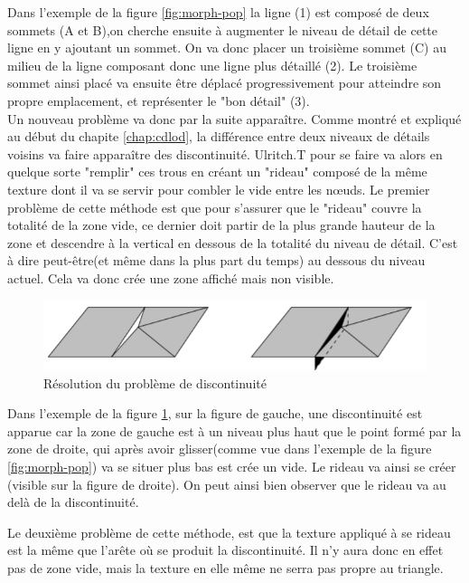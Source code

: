 \newpage
  Dans l'exemple de la figure \ref{fig:morph-pop} la ligne (1) est composé de deux sommets (A et B),on cherche ensuite à augmenter le niveau de détail de cette ligne en y ajoutant un sommet. On va donc placer un troisième sommet (C) au milieu de la ligne composant donc une ligne plus détaillé (2). Le troisième sommet ainsi placé va ensuite être déplacé progressivement pour atteindre son propre emplacement, et représenter le "bon détail" (3).\\

 Un nouveau problème va donc par la suite apparaître. Comme montré et expliqué au début du chapite \ref{chap:cdlod}, la différence entre deux niveaux de détails voisins va faire apparaître des discontinuité. Ulritch.T pour se faire va alors en quelque sorte "remplir" ces trous en créant un "rideau" composé de la même texture dont il va se servir pour combler le vide entre les n\oe{}uds.
 Le premier problème de cette méthode est que pour s'assurer que le "rideau" couvre la totalité de la zone vide, ce dernier doit partir de la plus grande hauteur de la zone et descendre à la vertical en dessous de la totalité du niveau de détail. C'est à dire peut-être(et même dans la plus part du temps) au dessous du niveau actuel. Cela va donc crée une zone affiché mais non visible.

 \begin{figure}[!ht]
    \includegraphics[width=12cm]{img/skirt.png}
    \caption[morph]{ Résolution du problème de discontinuité \protect\footnotemark}
    \label{fig:skirt}
\end{figure}

Dans l'exemple de la figure \ref{fig:skirt}, sur la figure de gauche, une discontinuité est apparue car la zone de gauche est à un niveau plus haut que le point formé par la zone de droite, qui après avoir glisser(comme vue dans l'exemple de la figure \ref{fig:morph-pop}) va se situer plus bas est crée un vide.
Le rideau va ainsi se créer (visible sur la figure de droite). On peut ainsi bien observer que le rideau va au delà de la discontinuité.

Le deuxième problème de cette méthode, est que la texture appliqué à se rideau est la même que l'arête où se produit la discontinuité. Il n'y aura donc en effet pas de zone vide, mais la texture en elle même ne serra pas propre au triangle.